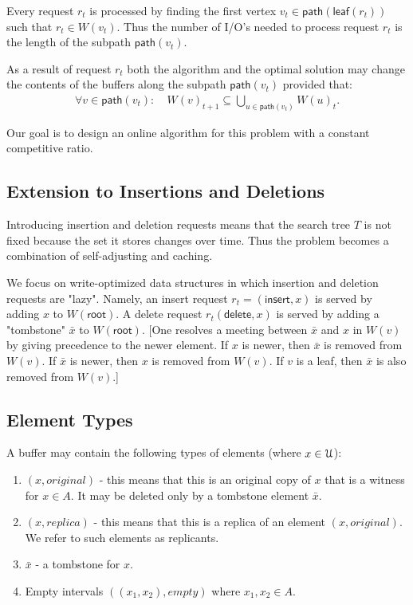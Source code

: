 \documentclass[a4paper,UKenglish]{lipics-v2016}
\renewcommand{\path}{\textsf{path}}
\newcommand{\leaf}{\textsf{leaf}}
\renewcommand{\insert}{\textsf{insert}}
\newcommand{\delete}{\textsf{delete}}
\renewcommand{\root}{\textsf{root}}
\newcommand{\calU}{{\cal U}}
\newcommand{\buf}[1]{W(#1)}
\newcommand{\tree}{T}
\begin{document}
Every request $r_t$ is processed by finding the first vertex $v_t\in \path(\leaf(r_t))$ such that $r_t\in \buf{v_t}$.
Thus the number of I/O's needed to process request $r_t$ is the length of the subpath $\path(v_t)$. 

As a result of request $r_t$ both the algorithm and the optimal solution may change the contents of the buffers along the subpath $\path(v_t)$ provided that:
\begin{align*}
\forall v\in\path(v_t): &~ \buf{v}_{t+1} \subseteq \bigcup_{u\in\path(v_t)} \buf{u}_{t}.
\end{align*}

Our goal is to design an online algorithm for this problem with a constant competitive ratio. 

\subsection{Extension to Insertions and Deletions}
Introducing insertion and deletion requests means that the search tree $\tree$ is not fixed because the set it stores changes over time.
Thus the problem becomes a combination of self-adjusting and caching. 

We focus on write-optimized data structures in which insertion and deletion requests are "lazy". Namely, an insert request $r_t=(\insert,x)$ is served by adding $x$ to $\buf{\root}$. A delete request $r_t(\delete,x)$ is served by adding a "tombstone" $\bar{x}$ to $\buf{\root}$. 
[One resolves a meeting between $\bar{x}$ and $x$ in $\buf{v}$ by giving precedence to the newer element. If $x$ is newer, then $\bar{x}$ is removed from $\buf{v}$. If $\bar{x}$ is newer, then $x$ is removed from $\buf{v}$. If $v$ is a leaf, then $\bar{x}$ is also removed from $\buf{v}$.]

\subsection{Element Types}
A buffer may contain the following types of elements (where $x\in \calU$):
\begin{enumerate}
\item $(x,original)$ - this means that this is an original copy of $x$ that is a witness for $x\in A$. It may be deleted only by a tombstone element $\bar{x}$.
\item $(x,replica)$ - this means that this is a replica of an element $(x,original)$. We refer to such elements as replicants.
\item $\bar{x}$ - a tombstone for $x$.
\item Empty intervals $((x_1,x_2), empty)$ where $x_1,x_2\in A$.
\end{enumerate}
\end{document}
